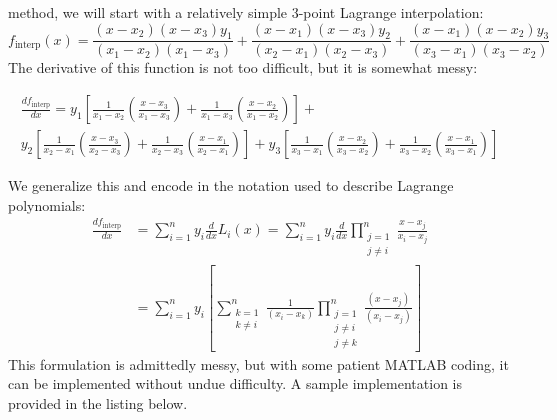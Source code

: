  method, we will start with a relatively simple 3-point Lagrange interpolation:
\begin{equation*}
f_{\text{interp}}(x) = \frac{(x - x_2)(x - x_3)y_1}{(x_1 - x_2)(x_1 - x_3)} + \frac{(x - x_1)(x-x_3)y_2}{(x_2 - x_1)(x_2 - x_3)} + \frac{(x - x_1)(x-x_2)y_3}{(x_3-x_1)(x_3 - x_2)}
\end{equation*}
The derivative of this function is not too difficult, but it is somewhat messy:
\begin{fullwidth}
\begin{multline*}
\frac{df_{\text{interp}}}{dx} = y_1\left[\frac{1}{x_1 - x_2}\left(\frac{x - x_3}{x_1 - x_3}\right) + \frac{1}{x_1-x_3}\left(\frac{x - x_2}{x_1 - x_2} \right)\right] + \\ y_2\left[\frac{1}{x_2 - x_1}\left(\frac{x - x_3}{x_2 - x_3}\right) + \frac{1}{x_2 - x_3}\left(\frac{x - x_1}{x_2 - x_1}\right) \right] + y_3 \left[\frac{1}{x_3 - x_1}\left(\frac{x - x_2}{x_3 - x_2}\right) + \frac{1}{x_3 - x_2}\left(\frac{x - x_1}{x_3 - x_1}\right) \right]
\end{multline*}
\end{fullwidth}
We generalize this and encode in the notation used to describe Lagrange polynomials:
\begin{align}
\frac{df_{\text{interp}}}{dx} &= \sum\limits_{i=1}^{n}y_i \frac{d}{dx}L_{i}(x) = \sum\limits_{i=1}^{n}y_i\frac{d}{dx}\prod_{\substack{j=1 \\ j \ne i}}^{n} \frac{x - x_j}{x_i - x_j} \\ \nonumber
&= \sum\limits_{i=1}^{n}y_i\left[\sum\limits_{\substack{k = 1 \\ k \ne i}}^{n}\frac{1}{\left(x_i - x_k\right)} \prod_{\substack{j=1 \\ j \ne i \\ j \ne k}}^{n} \frac{\left(x - x_j\right)}{\left(x_i - x_j\right)} \right]
\end{align}
This formulation is admittedly messy, but with some patient MATLAB coding, it can be implemented without undue difficulty. A sample implementation is provided in the listing below.
